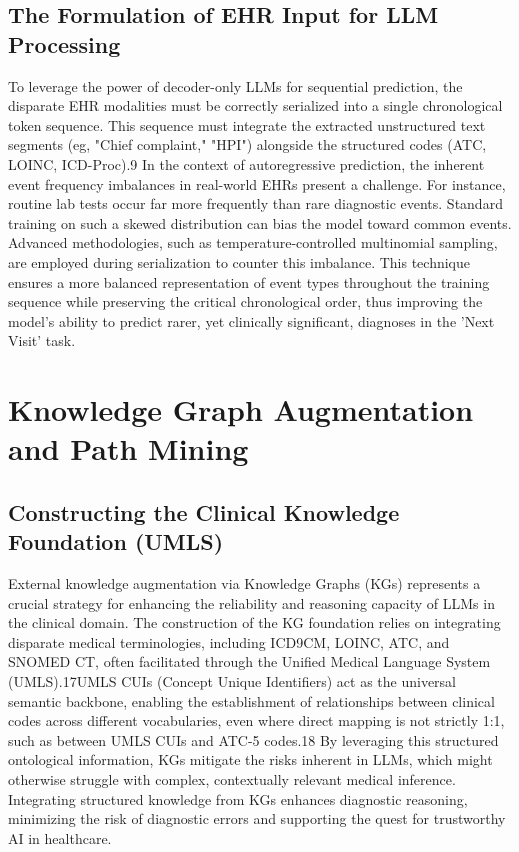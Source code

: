 \subsection{The Formulation of EHR Input for LLM Processing}
To leverage the power of decoder-only LLMs for sequential prediction, the disparate EHR modalities must be correctly serialized into a single chronological token sequence. This sequence must integrate the extracted unstructured text segments (eg, "Chief complaint," "HPI") alongside the structured codes (ATC, LOINC, ICD-Proc).9
In the context of autoregressive prediction, the inherent event frequency imbalances in real-world EHRs present a challenge. For instance, routine lab tests occur far more frequently than rare diagnostic events. Standard training on such a skewed distribution can bias the model toward common events. Advanced methodologies, such as temperature-controlled multinomial sampling, are employed during serialization to counter this imbalance. This technique ensures a more balanced representation of event types throughout the training sequence while preserving the critical chronological order, thus improving the model's ability to predict rarer, yet clinically significant, diagnoses in the 'Next Visit' task.

\section{Knowledge Graph Augmentation and Path Mining}
\subsection{Constructing the Clinical Knowledge Foundation (UMLS)}
External knowledge augmentation via Knowledge Graphs (KGs) represents a crucial strategy for enhancing the reliability and reasoning capacity of LLMs in the clinical domain. The construction of the KG foundation relies on integrating disparate medical terminologies, including ICD9CM, LOINC, ATC, and SNOMED CT, often facilitated through the Unified Medical Language System (UMLS).17UMLS CUIs (Concept Unique Identifiers) act as the universal semantic backbone, enabling the establishment of relationships between clinical codes across different vocabularies, even where direct mapping is not strictly 1:1, such as between UMLS CUIs and ATC-5 codes.18
By leveraging this structured ontological information, KGs mitigate the risks inherent in LLMs, which might otherwise struggle with complex, contextually relevant medical inference. Integrating structured knowledge from KGs enhances diagnostic reasoning, minimizing the risk of diagnostic errors and supporting the quest for trustworthy AI in healthcare.

